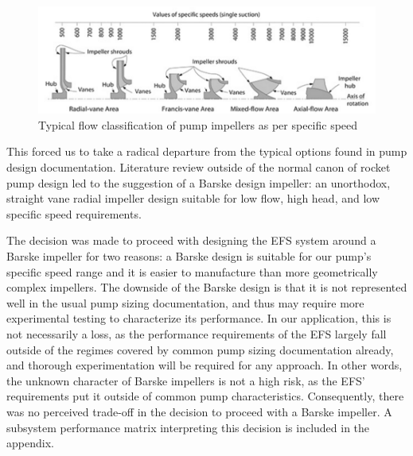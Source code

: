 \documentclass[11pt,twoside,a4paper,openright]{report}
\begin{document}
\begin{figure}[h]
\includegraphics[width=\textwidth]{Ns_Impeller_type_bw.png}
\caption{Typical flow classification of pump impellers as per specific speed}
\end{figure}

\vspace{12pt}
This forced us to take a radical departure from the typical options found in pump design documentation. Literature review outside of the normal canon of rocket pump design led to the suggestion of a Barske design impeller: an unorthodox, straight vane radial impeller design suitable for low flow, high head, and low specific speed requirements.\par
\vspace{12pt}
The decision was made to proceed with designing the EFS system around a Barske impeller for two reasons: a Barske design is suitable for our pump’s specific speed range and it is easier to manufacture than more geometrically complex impellers. The downside of the Barske design is that it is not represented well in the usual pump sizing documentation, and thus may require more experimental testing to characterize its performance. In our application, this is 
\newpage
\noindent
not necessarily a loss, as the performance requirements of the EFS largely fall outside of the regimes covered by common pump sizing documentation already, and thorough experimentation will be required for any approach. In other words, the unknown character of Barske impellers is not a high risk, as the EFS’ requirements put it outside of common pump characteristics. Consequently, there was no perceived trade-off in the decision to proceed with a Barske impeller. A subsystem performance matrix interpreting this decision is included in the appendix.\par
\end{document}
